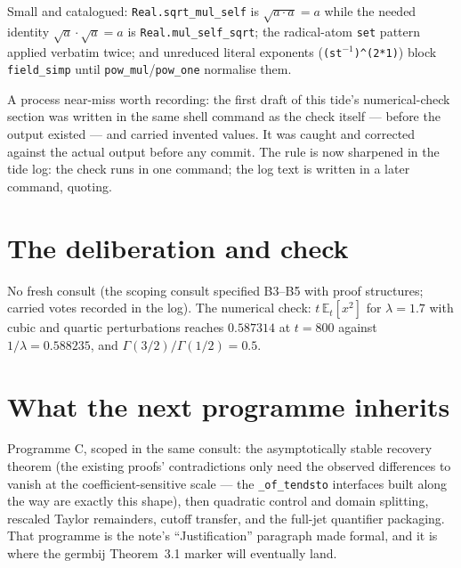 \documentclass[11pt]{article}
\begin{document}
Small and catalogued: \texttt{Real.sqrt\_mul\_self} is
$\sqrt{a \cdot a} = a$ while the needed identity
$\sqrt{a}\cdot\sqrt{a} = a$ is \texttt{Real.mul\_self\_sqrt}; the
radical-atom \texttt{set} pattern applied verbatim twice; and
unreduced literal exponents (\texttt{(st$^{-1}$)\^{}(2*1)}) block
\texttt{field\_simp} until \texttt{pow\_mul}/\texttt{pow\_one}
normalise them.

A process near-miss worth recording: the first draft of this tide's
numerical-check section was written in the same shell command as the
check itself --- before the output existed --- and carried invented
values. It was caught and corrected against the actual output before
any commit. The rule is now sharpened in the tide log: the check runs
in one command; the log text is written in a later command, quoting.

\section{The deliberation and check}

No fresh consult (the scoping consult specified B3--B5 with proof
structures; carried votes recorded in the log). The numerical check:
$t\,\mathbb{E}_t[x^2]$ for $\lambda = 1.7$ with cubic and quartic
perturbations reaches $0.587314$ at $t = 800$ against
$1/\lambda = 0.588235$, and $\Gamma(3/2)/\Gamma(1/2) = 0.5$.

\section{What the next programme inherits}

Programme C, scoped in the same consult: the asymptotically stable
recovery theorem (the existing proofs' contradictions only need the
observed differences to vanish at the coefficient-sensitive scale ---
the \texttt{\_of\_tendsto} interfaces built along the way are exactly
this shape), then quadratic control and domain splitting, rescaled
Taylor remainders, cutoff transfer, and the full-jet quantifier
packaging. That programme is the note's ``Justification'' paragraph
made formal, and it is where the germbij Theorem~3.1 marker will
eventually land.
\end{document}
